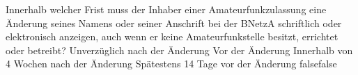     {Innerhalb welcher Frist muss der Inhaber einer Amateurfunkzulassung eine Änderung seines Namens oder seiner Anschrift bei der BNetzA schriftlich oder elektronisch anzeigen, auch wenn er keine Amateurfunkstelle besitzt, errichtet oder betreibt?}
    {Unverzüglich nach der Änderung}
    {Vor der Änderung}
    {Innerhalb von 4 Wochen nach der Änderung}
    {Spätestens 14 Tage vor der Änderung}
    {false}{false}